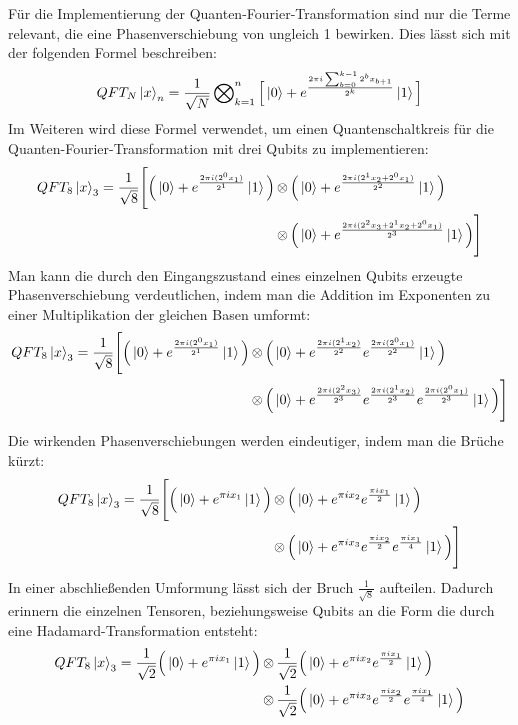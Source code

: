 Für die Implementierung der Quanten-Fourier-Transformation sind nur die Terme relevant, 
die eine Phasenverschiebung von ungleich 1 bewirken. 
Dies lässt sich mit der folgenden Formel beschreiben:
\[
QFT_{N}\ket{x}_{n} = \frac{1}{\sqrt{N}}
\operatorname{\bigotimes}_{k=1}^n \Big[  \ket{0} + { e^{\frac{2 \pi i \sum_{b=0}^{k-1}2^b x_{b+1} }{2^k}}}\ket{1}\Big]
\] 
Im Weiteren wird diese Formel verwendet, 
um einen Quantenschaltkreis für die Quanten-Fourier-Transformation mit drei Qubits zu implementieren:
\begin{align*}
QFT_{8}\ket{x}_{3} = 
\frac{1}{\sqrt{8}} 
  \Bigg[
    \Big(\ket{0} + { e^{\frac{2 \pi i (2^0x_1)}{2^1}}}\ket{1} \Big) 
    &\operatorname{\otimes}
    \Big(\ket{0} + { e^{\frac{2 \pi i (2^1x_2+2^0x_1)}{2^2}}}\ket{1} \Big) \\
    &\operatorname{\otimes}
    \Big(\ket{0} + { e^{\frac{2 \pi i (2^{2}x_3 +2^1x_2+2^0x_1)}{2^3}}}\ket{1} \Big) 
  \Bigg] 
\end{align*}
Man kann die durch den Eingangszustand eines einzelnen Qubits erzeugte Phasenverschiebung verdeutlichen, 
indem man die Addition im Exponenten zu einer Multiplikation der gleichen Basen umformt:
\begin{align*}
  QFT_{8}\ket{x}_{3} = 
  \frac{1}{\sqrt{8}} 
  \Bigg[
    \Big(\ket{0} + { e^{\frac{2 \pi i (2^0x_1)}{2^1}}}\ket{1}\Big) 
    &\operatorname{\otimes}
    \Big(\ket{0} + { e^{\frac{2 \pi i (2^1x_2)}{2^2}} e^{\frac{2 \pi i (2^0x_1)}{2^2}} }\ket{1} \Big) \\ 
    &\operatorname{\otimes}
    \Big(\ket{0} + { e^{\frac{2 \pi i (2^{2}x_3)}{2^3}} e^{\frac{2 \pi i (2^1x_2)}{2^3}} e^{\frac{2 \pi i (2^0x_1)}{2^3}}  }\ket{1} \Big)
  \Bigg] 
\end{align*}
Die wirkenden Phasenverschiebungen werden eindeutiger, 
indem man die Brüche kürzt:
\begin{align*}
  QFT_{8}\ket{x}_{3} = 
  \frac{1}{\sqrt{8}} 
  \Bigg[ 
    \Big( \ket{0} + e^{\pi i x_1}\ket{1} \Big) &\operatorname{\otimes}
    \Big(\ket{0} + { e^{\pi i x_2} e^{ \frac{ \pi i x_1}{2}} }\ket{1} \Big) \\ &\operatorname{\otimes}
    \Big(\ket{0} + { e^{\pi i x_3} e^{\frac{\pi i x_2}{2}} e^{ \frac{ \pi i x_1}{4}} }\ket{1} \Big) 
  \Bigg] 
\end{align*}
In einer abschließenden Umformung lässt sich der Bruch \(\frac{1}{\sqrt8}\) aufteilen.
Dadurch erinnern die einzelnen Tensoren,
beziehungsweise Qubits an die Form die durch eine Hadamard-Transformation entsteht:
\begin{align*}
  QFT_{8}\ket{x}_{3} = 
   \frac{1}{\sqrt{2}}\Big( \ket{0} + e^{\pi i x_1}\ket{1} \Big) 
   &\operatorname{\otimes}
  \frac{1}{\sqrt{2}}\Big( \ket{0} + { e^{\pi i x_2} e^{ \frac{ \pi i x_1}{2}} }\ket{1} \Big) \\ 
  &\operatorname{\otimes}
  \frac{1}{\sqrt{2}}\Big( \ket{0} + { e^{\pi i x_3} e^{\frac{\pi i x_2}{2}} e^{ \frac{ \pi i x_1}{4}} }\ket{1} \Big)  
\end{align*}
